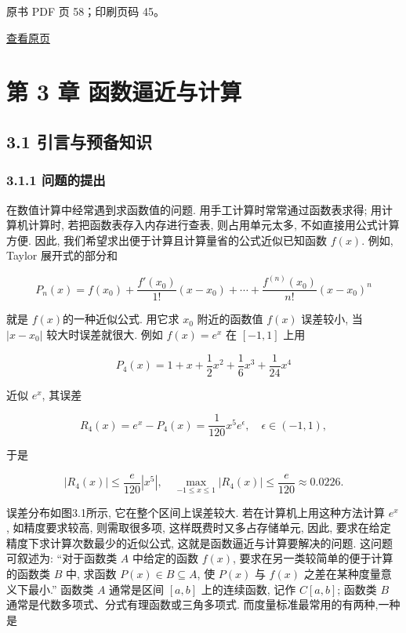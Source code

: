 \clearpage

原书 PDF 页 58；印刷页码 45。

\href{source-images/pdf-058.jpeg}{查看原页}

\section{第 3 章 函数逼近与计算}\label{ch03a-ux7b2c-3-ux7ae0-ux51fdux6570ux903cux8fd1ux4e0eux8ba1ux7b97}

\subsection{3.1 引言与预备知识}\label{ch03a-ux5f15ux8a00ux4e0eux9884ux5907ux77e5ux8bc6}

\subsubsection{3.1.1 问题的提出}\label{ch03a-ux95eeux9898ux7684ux63d0ux51fa}

在数值计算中经常遇到求函数值的问题. 用手工计算时常常通过函数表求得; 用计算机计算时, 若把函数表存入内存进行查表, 则占用单元太多, 不如直接用公式计算方便. 因此, 我们希望求出便于计算且计算量省的公式近似已知函数 \(f(x)\). 例如, Taylor 展开式的部分和

\[
P_n(x) = f(x_0) + \frac{f'(x_0)}{1!}(x-x_0) + \cdots + \frac{f^{(n)}(x_0)}{n!}(x-x_0)^n \tag{3.1.1}
\]

就是 \(f(x)\)的一种近似公式. 用它求 \(x_0\) 附近的函数值 \(f(x)\) 误差较小, 当 \(|x-x_0|\) 较大时误差就很大. 例如 \(f(x)=e^x\) 在 \([-1,1]\) 上用

\[
P_4(x) = 1+x+\frac{1}{2}x^2+\frac{1}{6}x^3+\frac{1}{24}x^4
\]

近似 \(e^x\), 其误差

\[
R_4(x)=e^x-P_4(x)=\frac{1}{120}x^5e^\epsilon, \quad \epsilon \in(-1,1),
\]

于是

\[
|R_4(x)| \leqslant \frac{e}{120}|x^5|, \quad \max_{-1 \leqslant x \leqslant 1}|R_4(x)| \leqslant \frac{e}{120} \approx 0.0226.
\]

误差分布如图3.1所示, 它在整个区间上误差较大. 若在计算机上用这种方法计算 \(e^x\), 如精度要求较高, 则需取很多项, 这样既费时又多占存储单元, 因此, 要求在给定精度下求计算次数最少的近似公式, 这就是函数逼近与计算要解决的问题. 这问题可叙述为: ``对于函数类 \(A\) 中给定的函数 \(f(x)\), 要求在另一类较简单的便于计算的函数类 \(B\) 中, 求函数 \(P(x) \in B \subseteq A\), 使 \(P(x)\) 与 \(f(x)\) 之差在某种度量意义下最小.'' 函数类 \(A\) 通常是区间 \([a,b]\) 上的连续函数, 记作 \(C[a,b]\); 函数类 \(B\) 通常是代数多项式、分式有理函数或三角多项式. 而度量标准最常用的有两种,一种是

